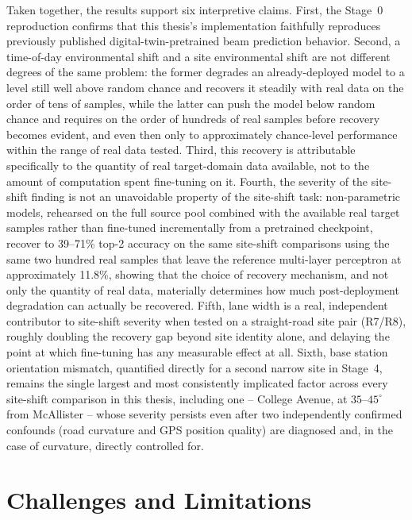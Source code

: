 \documentclass{iutbscthesis}
\begin{document}
Taken together, the results support six interpretive claims. First, the Stage~0 reproduction confirms that this thesis's implementation faithfully reproduces previously published digital-twin-pretrained beam prediction behavior. Second, a time-of-day environmental shift and a site environmental shift are not different degrees of the same problem: the former degrades an already-deployed model to a level still well above random chance and recovers it steadily with real data on the order of tens of samples, while the latter can push the model below random chance and requires on the order of hundreds of real samples before recovery becomes evident, and even then only to approximately chance-level performance within the range of real data tested. Third, this recovery is attributable specifically to the quantity of real target-domain data available, not to the amount of computation spent fine-tuning on it. Fourth, the severity of the site-shift finding is not an unavoidable property of the site-shift task: non-parametric models, rehearsed on the full source pool combined with the available real target samples rather than fine-tuned incrementally from a pretrained checkpoint, recover to 39--71\% top-2 accuracy on the same site-shift comparisons using the same two hundred real samples that leave the reference multi-layer perceptron at approximately 11.8\%, showing that the choice of recovery mechanism, and not only the quantity of real data, materially determines how much post-deployment degradation can actually be recovered. Fifth, lane width is a real, independent contributor to site-shift severity when tested on a straight-road site pair (R7/R8), roughly doubling the recovery gap beyond site identity alone, and delaying the point at which fine-tuning has any measurable effect at all. Sixth, base station orientation mismatch, quantified directly for a second narrow site in Stage~4, remains the single largest and most consistently implicated factor across every site-shift comparison in this thesis, including one -- College Avenue, at $35$--$45^\circ$ from McAllister -- whose severity persists even after two independently confirmed confounds (road curvature and GPS position quality) are diagnosed and, in the case of curvature, directly controlled for.

\section{Challenges and Limitations}
\label{sec:challenges}
\end{document}
